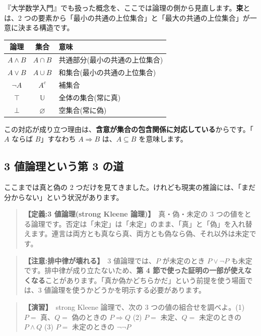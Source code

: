 \documentclass{article}
\begin{document}
『大学数学入門』でも扱った概念を、ここでは論理の側から見直します。\textbf{束}とは、2 つの要素から「最小の共通の上位集合」と「最大の共通の上位集合」が一意に決まる構造です。

\begin{center}
\begin{tabular}{|c|c|l|}
\hline
論理 & 集合 & 意味 \\
\hline
\(A \land B\) & \(A \cap B\) & 共通部分(最小の共通の上位集合) \\
\(A \lor B\) & \(A \cup B\) & 和集合(最小の共通の上位集合) \\
\(\neg A\) & \(A^{c}\) & 補集合 \\
\(\top\) & \(\mathbb{U}\) & 全体の集合(常に真) \\
\(\bot\) & \(\varnothing\) & 空集合(常に偽) \\
\hline
\end{tabular}
\end{center}

この対応が成り立つ理由は、\textbf{含意が集合の包含関係に対応している}からです。「\(A\) ならば \(B\)」すなわち \(A \Rightarrow B\) は、\(A \subseteq B\) を意味します。

\subsection{3 値論理という第 3 の道}

ここまでは真と偽の 2 つだけを見てきました。けれども現実の推論には、「まだ分からない」という状況があります。

\begin{quote}
\textbf{【定義:3 値論理(strong Kleene 論理)】}\ 真・偽・未定の 3 つの値をとる論理です。否定は「未定」は「未定」のまま、「真」と「偽」を入れ替えます。連言は両方とも真なら真、両方とも偽なら偽、それ以外は未定です。
\end{quote}

\begin{quote}
\textbf{【注意:排中律が壊れる】}\ 3 値論理では、\(P\) が未定のとき \(P \lor \neg P\) も未定です。排中律が成り立たないため、\textbf{第 4 節で使った証明の一部が使えなくなる}ことがあります。「真か偽かどちらかだ」という前提を使う場面では、3 値論理を使うかどうかを明示する必要があります。
\end{quote}

\begin{quote}
\textbf{【演習】}\ strong Kleene 論理で、次の 3 つの値の組合せを調べよ。(1) \(P =\) 真、\(Q =\) 偽のときの \(P \Rightarrow Q\) (2) \(P =\) 未定、\(Q =\) 未定のときの \(P \land Q\) (3) \(P =\) 未定のときの \(\neg \neg P\)
\end{quote}
\end{document}
